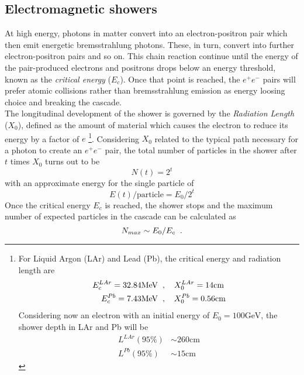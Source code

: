 \subsection{Electromagnetic showers}
At high energy, photons in matter convert into an electron-positron pair which then emit energetic bremsstrahlung photons. These, in turn, convert into further electron-positron pairs and so on. This chain reaction continue until the energy of the pair-produced electrons and positrons drops below an energy threshold, known as the \emph{critical energy} ($E_c$). Once that point is reached, the $e^+ e^-$ pairs will prefer atomic collisions rather than bremsstrahlung emission as energy loosing choice and breaking the cascade\cite{Leo302344}.
\\
The longitudinal development of the shower is governed by the \emph{Radiation Length} ($X_0$), defined as the amount of material which causes the electron to reduce its energy by a factor of $e$ \footnote{For Liquid Argon (LAr) and Lead (Pb), the critical energy and radiation length are
\begin{align*}
E_c^{LAr} = 32.84 \text{MeV} \hspace{0.2cm},& \hspace{0.4cm} X_0^{LAr} = 14 \text{cm} \\
E_c^{Pb} = 7.43 \text{MeV} \hspace{0.2cm},& \hspace{0.4cm} X_0^{Pb} = 0.56 \text{cm}
\end{align*}
Considering now an electron with an initial energy of $E_0 = 100 \text{GeV}$, the shower depth in LAr and Pb will be
\begin{align*}
L^{LAr}(95\%) &\sim 260 \text{cm} \\
L^{Pb}(95\%) &\sim 15 \text{cm}
\end{align*}}.
Considering $X_0$ related to the typical path necessary for a photon to create an $e^+e^-$ pair, the total number of particles in the shower after $t$ times $X_0$ turns out to be
\begin{equation}
N(t) = 2^t
\end{equation}
with an approximate energy for the single particle of
\begin{equation}
E(t)/\text{particle} = E_0/2^t
\end{equation}
Once the critical energy $E_c$ is reached, the shower stops and the maximum number of expected particles in the cascade can be calculated as
\begin{equation}
N_{max} \sim E_0 / E_c \hspace{0.2cm} \text{.}
\end{equation}
